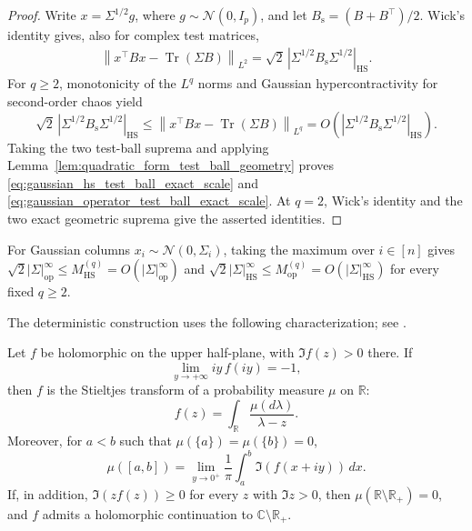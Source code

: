 \documentclass[EJP, preprint, NODS, nobera, nofontexpansion]{ejpecp}
\DeclareMathOperator{\op}{op}
\DeclareMathOperator{\tr}{Tr}
\DeclareMathOperator{\hs}{HS}
\begin{document}
\begin{proof}
Write $x=\Sigma^{1/2}g$, where $g\sim\mathcal N(0,I_p)$, and let
$B_{\mathrm s}=(B+B^{\top})/2$.  Wick's identity gives, also for complex
test matrices,
\begin{align*}
    \left\|x^{\top}Bx-\tr(\Sigma B)\right\|_{L^2}
    =\sqrt2\,
      |\Sigma^{1/2}B_{\mathrm s}\Sigma^{1/2}|_{\hs}.
\end{align*}
For $q\geq2$, monotonicity of the $L^q$ norms and Gaussian
hypercontractivity for second-order chaos yield
\[
    \sqrt2\,
      |\Sigma^{1/2}B_{\mathrm s}\Sigma^{1/2}|_{\hs}
    \leq
    \left\|x^{\top}Bx-\tr(\Sigma B)\right\|_{L^q}
    =
    O\!\left(|\Sigma^{1/2}B_{\mathrm s}\Sigma^{1/2}|_{\hs}\right).
\]
Taking the two test-ball suprema and applying
Lemma~\ref{lem:quadratic_form_test_ball_geometry} proves
\eqref{eq:gaussian_hs_test_ball_exact_scale} and
\eqref{eq:gaussian_operator_test_ball_exact_scale}.  At $q=2$, Wick's
identity and the two exact geometric suprema give the asserted identities.
\end{proof}

For Gaussian columns $x_i\sim\mathcal N(0,\Sigma_i)$, taking the maximum
over $i\in[n]$ gives
$\sqrt2|\Sigma|_{\op}^\infty\leq M_{\hs}^{(q)}
=O(|\Sigma|_{\op}^\infty)$ and
$\sqrt2|\Sigma|_{\hs}^\infty\leq M_{\op}^{(q)}
=O(|\Sigma|_{\hs}^\infty)$ for every fixed $q\geq2$.

The deterministic construction uses the following characterization;
see \cite{BOL97,kammoun2016no}.

\begin{theorem}
\label{the:condition_stieltjes_transform}
Let $f$ be holomorphic on the upper half-plane, with $\Im f(z)>0$ there. If
\[
    \lim_{y\to+\infty}iy\,f(iy)=-1,
\]
then $f$ is the Stieltjes transform of a probability measure $\mu$ on
$\mathbb R$:
\[
    f(z)=\int_{\mathbb R}\frac{\mu(d\lambda)}{\lambda-z}.
\]
Moreover, for \(a<b\) such that
\(\mu(\{a\})=\mu(\{b\})=0\),
\[
    \mu([a,b])
    =\lim_{y\to0^+}\frac1\pi
      \int_a^b\Im(f(x+iy))\,dx.
\]
If, in addition, $\Im(zf(z))\geq0$ for every $z$ with $\Im z>0$, then
$\mu(\mathbb R\setminus\mathbb R_+)=0$, and $f$ admits a holomorphic
continuation to $\mathbb C\setminus\mathbb R_+$.
\end{theorem}


 
 
\end{document}
